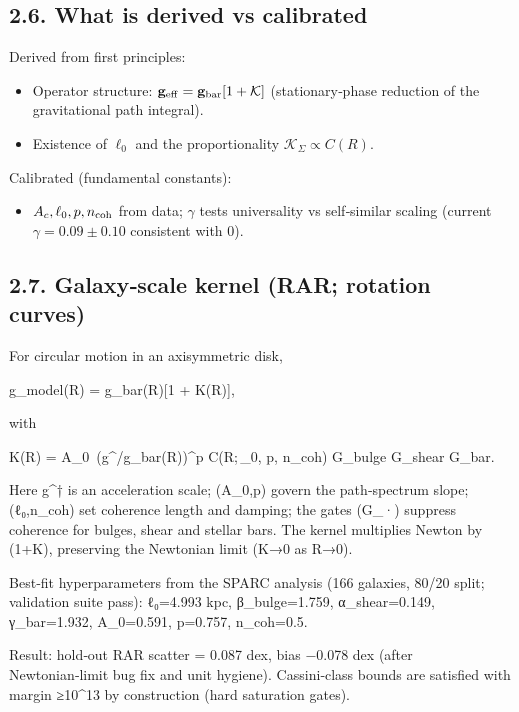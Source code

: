 \documentclass[11pt,a4paper]{article}
\begin{document}
\subsection{2.6. What is derived vs calibrated}


Derived from first principles:

\begin{itemize}
\item Operator structure: $\mathbf{g}_{\rm eff}=\mathbf{g}_{\rm bar}[1+\mathcal{K}]$ (stationary‑phase reduction of the gravitational path integral).
\item Existence of $\ell_0$ and the proportionality $\mathcal{K}_\Sigma\propto C(R)$.
\end{itemize}


Calibrated (fundamental constants):

\begin{itemize}
\item $A_c,\ell_0,p,n_{\rm coh}$ from data; $\gamma$ tests universality vs self‑similar scaling (current $\gamma=0.09\pm0.10$ consistent with 0).
\end{itemize}



\subsection{2.7. Galaxy‑scale kernel (RAR; rotation curves)}


For circular motion in an axisymmetric disk,


g\_model(R) = g\_bar(R)[1 + K(R)],


with


K(R) = A\_0\, (g^\dagger/g\_{\rm bar}(R))^p\; C(R;\,\ell\_0, p, n\_{\rm coh})\; G\_{\rm bulge}\; G\_{\rm shear}\; G\_{\rm bar}.


Here g^† is an acceleration scale; (A\_0,p) govern the path‑spectrum slope; (ℓ₀,n\_{\rm coh}) set coherence length and damping; the gates (G\_·) suppress coherence for bulges, shear and stellar bars. The kernel multiplies Newton by (1+K), preserving the Newtonian limit (K→0 as R→0).


Best‑fit hyperparameters from the SPARC analysis (166 galaxies, 80/20 split; validation suite pass): ℓ₀=4.993 kpc, β\_bulge=1.759, α\_shear=0.149, γ\_bar=1.932, A\_0=0.591, p=0.757, n\_{\rm coh}=0.5.


Result: hold‑out RAR scatter = 0.087 dex, bias −0.078 dex (after Newtonian‑limit bug fix and unit hygiene). Cassini‑class bounds are satisfied with margin ≥10^13 by construction (hard saturation gates).
\end{document}
